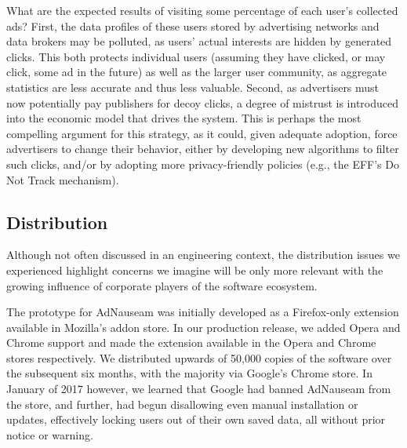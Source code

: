 \documentclass[conference]{IEEEtran}
\begin{document}
What are the expected results of visiting some percentage of each user's collected ads? First, the data profiles of these users stored by advertising networks and data brokers may be polluted, as users' actual interests are hidden by generated clicks. This both protects individual users (assuming they have clicked, or may click, some ad in the future) as well as the larger user community, as aggregate statistics are less accurate and thus less valuable. Second, as advertisers must now potentially pay publishers for decoy clicks, a degree of mistrust is introduced into the economic model that drives the system. This is perhaps the most compelling argument for this strategy, as it could, given adequate adoption, force advertisers to change their behavior, either by developing new algorithms to filter such clicks, and/or by adopting more privacy-friendly policies (e.g., the EFF's Do Not Track mechanism).

\subsection{Distribution}

Although not often discussed in an engineering context, the distribution issues we experienced highlight concerns we imagine will be only more relevant with the growing influence of corporate players of the software ecosystem.

The prototype for AdNauseam was initially developed as a Firefox-only extension available in  Mozilla's addon store. In our production release, we added Opera and Chrome support and made the extension available in the Opera and Chrome stores respectively. We distributed upwards of 50,000 copies of the software over the subsequent six months, with the majority via Google's Chrome store. In January of 2017 however, we learned that Google had banned AdNauseam from the store, and further, had begun disallowing even manual installation or updates, effectively locking users out of their own saved data, all without prior notice or warning.
\end{document}
